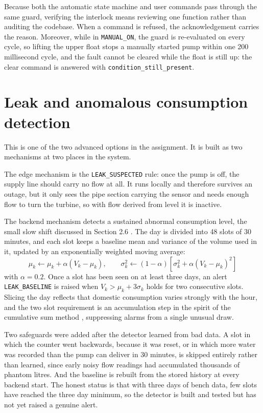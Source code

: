 Because both the automatic state machine and user commands pass through the same guard, verifying the interlock means reviewing one function rather than auditing the codebase. When a command is refused, the acknowledgement carries the reason. Moreover, while in \texttt{MANUAL\_ON}, the guard is re-evaluated on every cycle, so lifting the upper float stops a manually started pump within one 200 millisecond cycle, and the fault cannot be cleared while the float is still up: the clear command is answered with \texttt{condition\_still\_present}.

\section{Leak and anomalous consumption detection}

This is one of the two advanced options in the assignment. It is built as two mechanisms at two places in the system.

The edge mechanism is the \texttt{LEAK\_SUSPECTED} rule: once the pump is off, the supply line should carry no flow at all. It runs locally and therefore survives an outage, but it only sees the pipe section carrying the sensor and needs enough flow to turn the turbine, so with flow derived from level it is inactive.

The backend mechanism detects a sustained abnormal consumption level, the small slow shift discussed in Section 2.6 \cite{page1954}. The day is divided into 48 slots of 30 minutes, and each slot keeps a baseline mean and variance of the volume used in it, updated by an exponentially weighted moving average:
\begin{equation}
\mu_k \leftarrow \mu_k + \alpha (V_k - \mu_k), \qquad
\sigma^2_k \leftarrow (1-\alpha)\left[\sigma^2_k + \alpha (V_k - \mu_k)^2\right]
\label{eq:ewma}
\end{equation}
with $\alpha = 0.2$. Once a slot has been seen on at least three days, an alert \texttt{LEAK\_BASELINE} is raised when $V_k > \mu_k + 3\sigma_k$ holds for two consecutive slots. Slicing the day reflects that domestic consumption varies strongly with the hour, and the two slot requirement is an accumulation step in the spirit of the cumulative sum method \cite{page1954}, suppressing alarms from a single unusual draw.

Two safeguards were added after the detector learned from bad data. A slot in which the counter went backwards, because it was reset, or in which more water was recorded than the pump can deliver in 30 minutes, is skipped entirely rather than learned, since early noisy flow readings had accumulated thousands of phantom litres. And the baseline is rebuilt from the stored history at every backend start. The honest status is that with three days of bench data, few slots have reached the three day minimum, so the detector is built and tested but has not yet raised a genuine alert.


